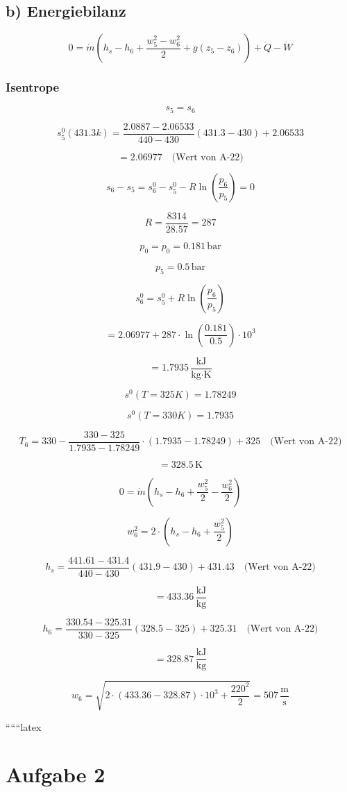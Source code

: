 \subsection*{b) Energiebilanz}

\[
0 = \dot{m} (h_s - h_6 + \frac{w_5^2 - w_6^2}{2} + g(z_5 - z_6)) + \dot{Q} - \dot{W}
\]

\subsubsection*{Isentrope}

\[
s_5 = s_6
\]

\[
s_5^0 (431.3 k) = \frac{2.0887 - 2.06533}{440 - 430} (431.3 - 430) + 2.06533
\]

\[
= 2.06977 \quad \text{(Wert von A-22)}
\]

\[
s_6 - s_5 = s_6^0 - s_5^0 - R \ln \left( \frac{p_6}{p_5} \right) = 0
\]

\[
R = \frac{8314}{28.57} = 287
\]

\[
p_0 = p_0 = 0.181 \, \text{bar}
\]

\[
p_5 = 0.5 \, \text{bar}
\]

\[
s_6^0 = s_5^0 + R \ln \left( \frac{p_6}{p_5} \right)
\]

\[
= 2.06977 + 287 \cdot \ln \left( \frac{0.181}{0.5} \right) \cdot 10^3
\]

\[
= 1.7935 \, \frac{\text{kJ}}{\text{kg} \cdot \text{K}}
\]

\[
s^0 (T = 325 K) = 1.78249
\]

\[
s^0 (T = 330 K) = 1.7935
\]

\[
T_6 = 330 - \frac{330 - 325}{1.7935 - 1.78249} \cdot (1.7935 - 1.78249) + 325 \quad \text{(Wert von A-22)}
\]

\[
= 328.5 \, \text{K}
\]

\[
0 = \dot{m} (h_s - h_6 + \frac{w_5^2}{2} - \frac{w_6^2}{2})
\]

\[
w_6^2 = 2 \cdot (h_s - h_6 + \frac{w_5^2}{2})
\]

\[
h_s = \frac{441.61 - 431.4}{440 - 430} (431.9 - 430) + 431.43 \quad \text{(Wert von A-22)}
\]

\[
= 433.36 \, \frac{\text{kJ}}{\text{kg}}
\]

\[
h_6 = \frac{330.54 - 325.31}{330 - 325} (328.5 - 325) + 325.31 \quad \text{(Wert von A-22)}
\]

\[
= 328.87 \, \frac{\text{kJ}}{\text{kg}}
\]

\[
w_6 = \sqrt{2 \cdot (433.36 - 328.87) \cdot 10^3 + \frac{220^2}{2}} = 507 \, \frac{\text{m}}{\text{s}}
\]

``````latex

\section*{Aufgabe 2}